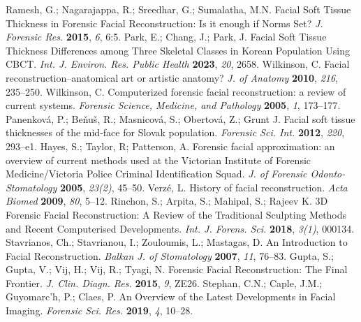 \documentclass[journal,article,submit,pdftex,moreauthors]{Definitions/mdpi}
\begin{document}
\begin{thebibliography}{999}
Ramesh, G.; Nagarajappa, R.; Sreedhar, G.; Sumalatha, M.N. Facial Soft Tissue Thickness in Forensic Facial Reconstruction: Is it enough if Norms Set? {\em J. Forensic Res.} {\bf 2015}, {\em 6}, 6:5.
Park, E.; Chang, J.; Park, J. Facial Soft Tissue Thickness Differences among Three Skeletal Classes in Korean Population Using CBCT. {\em Int. J. Environ. Res. Public Health} {\bf 2023}, {\em 20}, 2658.
Wilkinson, C. Facial reconstruction--anatomical art or artistic anatomy? {\em J. of Anatomy} {\bf 2010}, {\em 216}, 235--250.
Wilkinson, C. Computerized forensic facial reconstruction: a review of current systems. {\em Forensic Science, Medicine, and Pathology} {\bf 2005}, {\em 1}, 173--177.
Panenkov{\'a}, P.; Be{\v{n}}u{\v{s}}, R.; Masnicov{\'a}, S.; Obertov{\'a}, Z.; Grunt J. Facial soft tissue thicknesses of the mid-face for Slovak population. {\em Forensic Sci. Int.} {\bf 2012}, {\em 220}, 293--e1.
Hayes, S.; Taylor, R; Patterson, A. Forensic facial approximation: an overview of current methods used at the Victorian Institute of Forensic Medicine/Victoria Police Criminal Identification Squad. {\em J. of Forensic Odonto-Stomatology} {\bf 2005}, {\em 23(2)}, 45--50.
Verz{\'e}, L. History of facial reconstruction. {\em Acta Biomed} {\bf 2009}, {\em 80}, 5--12.
Rinchon, S.; Arpita, S.; Mahipal, S.; Rajeev K. 3D Forensic Facial Reconstruction: A Review of the Traditional Sculpting Methods and Recent Computerised Developments. {\em Int. J. Forens. Sci.} {\bf 2018}, {\em 3(1)}, 000134.
Stavrianos, Ch.; Stavrianou, I.; Zouloumis, L.; Mastagas, D. An Introduction to Facial Reconstruction. {\em Balkan J. of Stomatology} {\bf 2007}, {\em 11}, 76--83.
Gupta, S.; Gupta, V.; Vij, H.; Vij, R.; Tyagi, N. Forensic Facial Reconstruction: The Final Frontier. {\em J. Clin. Diagn. Res.} {\bf 2015}, {\em 9}, ZE26.
Stephan, C.N.; Caple, J.M.; Guyomarc’h, P.; Claes, P. An Overview of the Latest Developments in Facial Imaging. {\em Forensic Sci. Res.} {\bf 2019}, {\em 4}, 10--28.

\end{thebibliography}
\end{document}

